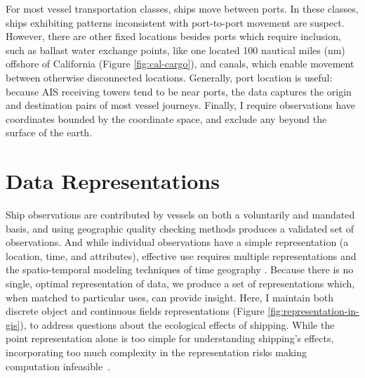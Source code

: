For most vessel transportation classes, ships move between ports. In these classes, ships exhibiting patterns inconsistent with port-to-port movement are suspect.  However, there are other fixed locations besides ports which require inclusion, such as ballast water exchange points, like one located 100 nautical miles (nm) offshore of California (Figure \ref{fig:cal-cargo}), and canals, which enable movement between otherwise disconnected locations. Generally, port location is useful: because AIS receiving towers tend to be near ports, the data captures the origin and destination pairs of most vessel journeys. Finally, I require observations have coordinates bounded by the coordinate space, and exclude any beyond the surface of the earth. 


\section{Data Representations}

Ship observations are contributed by vessels on both a voluntarily and mandated basis, and using geographic quality checking methods produces a validated set of observations. And while individual observations have a simple representation (a location, time, and attributes), effective use requires multiple representations \citep{Goodchild1992} and the spatio-temporal modeling techniques of time geography \citep{miller2008field}.  Because there is no single, optimal representation of data, we produce a set of representations which, when matched to particular uses, can provide insight.  Here, I maintain both discrete object and continuous fields representations (Figure \ref{fig:representation-in-gis}), to address questions about the ecological effects of shipping. While the point representation alone is too simple for understanding shipping's effects, incorporating too much complexity in the representation risks making computation infeasible~\citep{de2007geospatial}.

